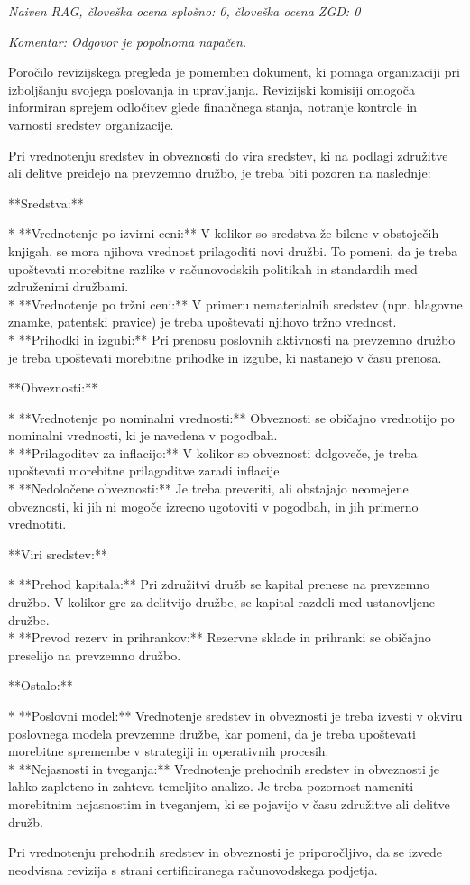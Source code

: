 \documentclass[a4paper,12pt,openright]{book}
\begin{document}
\textit{Naiven RAG, človeška ocena splošno: 0, človeška ocena ZGD: 0}

\textit{Komentar: Odgovor je popolnoma napačen.}

\begin{mdframed}[linewidth=1pt]
\raggedright
\ttfamily
Poročilo revizijskega pregleda je pomemben dokument, ki pomaga organizaciji pri izboljšanju svojega poslovanja in upravljanja. Revizijski komisiji omogoča informiran sprejem odločitev glede finančnega stanja, notranje kontrole in varnosti sredstev organizacije.

Pri vrednotenju sredstev in obveznosti do vira sredstev, ki na podlagi združitve ali delitve preidejo na prevzemno družbo, je treba biti pozoren na naslednje:

**Sredstva:**

* **Vrednotenje po izvirni ceni:** V kolikor so sredstva že bilene v obstoječih knjigah, se mora njihova vrednost prilagoditi novi družbi. To pomeni, da je treba upoštevati morebitne razlike v računovodskih politikah in standardih med združenimi družbami. \\
* **Vrednotenje po tržni ceni:** V primeru nematerialnih sredstev (npr. blagovne znamke, patentski pravice) je treba upoštevati njihovo tržno vrednost. \\
* **Prihodki in izgubi:** Pri prenosu poslovnih aktivnosti na prevzemno družbo je treba upoštevati morebitne prihodke in izgube, ki nastanejo v času prenosa.

**Obveznosti:**

* **Vrednotenje po nominalni vrednosti:** Obveznosti se običajno vrednotijo po nominalni vrednosti, ki je navedena v pogodbah. \\
* **Prilagoditev za inflacijo:** V kolikor so obveznosti dolgoveče, je treba upoštevati morebitne prilagoditve zaradi inflacije. \\
* **Nedoločene obveznosti:** Je treba preveriti, ali obstajajo neomejene obveznosti, ki jih ni mogoče izrecno ugotoviti v pogodbah, in jih primerno vrednotiti.

**Viri sredstev:**

* **Prehod kapitala:** Pri združitvi družb se kapital prenese na prevzemno družbo. V kolikor gre za delitvijo družbe, se kapital razdeli med ustanovljene družbe. \\
* **Prevod rezerv in prihrankov:** Rezervne sklade in prihranki se običajno preselijo na prevzemno družbo.

**Ostalo:**

* **Poslovni model:** Vrednotenje sredstev in obveznosti je treba izvesti v okviru poslovnega modela prevzemne družbe, kar pomeni, da je treba upoštevati morebitne spremembe v strategiji in operativnih procesih. \\
* **Nejasnosti in tveganja:** Vrednotenje prehodnih sredstev in obveznosti je lahko zapleteno in zahteva temeljito analizo. Je treba pozornost nameniti morebitnim nejasnostim in tveganjem, ki se pojavijo v času združitve ali delitve družb.

Pri vrednotenju prehodnih sredstev in obveznosti je priporočljivo, da se izvede neodvisna revizija s strani certificiranega računovodskega podjetja.
\end{mdframed}
\end{document}
